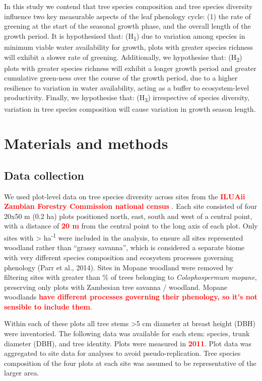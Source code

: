 \documentclass[11pt,a4paper]{article}
\newcommand{\todo}[1]{\textcolor{red}{\textbf{#1}}}   %
\begin{document}
In this study we contend that tree species composition and tree species diversity influence two key measurable aspects of the leaf phenology cycle: (1) the rate of greening at the start of the seasonal growth phase, and the overall length of the growth period. It is hypothesised that: (H\textsubscript{1}) due to variation among species in minimum viable water availability for growth, plots with greater species richness will exhibit a slower rate of greening. Additionally, we hypothesise that: (H\textsubscript{2}) plots with greater species richness will exhibit a longer growth period and greater cumulative green-ness over the course of the growth period, due to a higher resilience to variation in water availability, acting as a buffer to ecosystem-level productivity. Finally, we hypothesise that: (H\textsubscript{3}) irrespective of species diversity, variation in tree species composition will cause variation in growth season length. 

\section{Materials and methods}

\subsection{Data collection}

We used plot-level data on tree species diversity across \nSites{} sites from the \todo{ILUAii Zambian Forestry Commission national census} \citep{}. Each site consisted of four 20x50 m (0.2 ha) plots positioned north, east, south and west of a central point, with a distance of \todo{20 m} from the central point to the long axis of each plot. Only sites with >\stemsHa{} ha\textsuperscript{-1} were included in the analysis, to ensure all sites represented woodland rather than “grassy savanna”, which is considered a separate biome with very different species composition and ecosystem processes governing phenology (Parr et al., 2014). Sites in Mopane woodland were removed by filtering sites with greater than \mopanePer{}\% of trees belonging to \textit{Colophospermum mopane}, preserving only plots with Zambesian tree savanna / woodland. Mopane woodlands \todo{have different processes governing their phenology, so it's not sensible to include them}.

Within each of these plots all tree stems >5 cm diameter at breast height (DBH) were inventoried. The following data was available for each stem: species, trunk diameter (DBH), and tree identity. Plots were measured in \todo{2011}. Plot data was aggregated to site data for analyses to avoid pseudo-replication. Tree species composition of the four plots at each site was assumed to be representative of the larger area.
\end{document}

